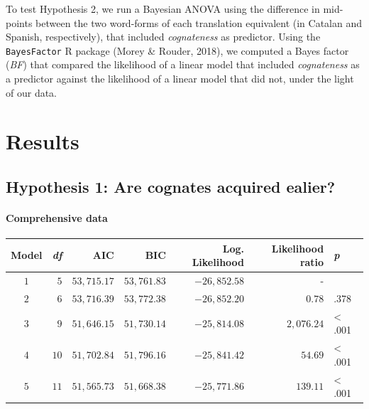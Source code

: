 \documentclass[
  english,
  man,man,floatsintext]{apa6}
\let\oldparagraph\paragraph
\renewcommand{\paragraph}[1]{\oldparagraph{#1}\mbox{}}
\begin{document}
To test Hypothesis 2, we run a Bayesian ANOVA using the difference in mid-points between the two word-forms of each translation equivalent (in Catalan and Spanish, respectively), that included \emph{cognateness} as predictor. Using the \texttt{BayesFactor} R package (Morey \& Rouder, 2018), we computed a Bayes factor (\emph{BF}) that compared the likelihood of a linear model that included \emph{cognateness} as a predictor against the likelihood of a linear model that did not, under the light of our data.

\hypertarget{results}{%
\section{Results}\label{results}}

\hypertarget{hypothesis-1-are-cognates-acquired-ealier}{%
\subsection{Hypothesis 1: Are cognates acquired ealier?}\label{hypothesis-1-are-cognates-acquired-ealier}}

\hypertarget{comprehensive-data}{%
\paragraph{Comprehensive data}\label{comprehensive-data}}

\captionsetup[table]{labelformat=empty,skip=1pt}
\begin{longtable}{crrrrrl}
\toprule
Model & \emph{df} & AIC & BIC & Log. Likelihood & Likelihood ratio & \emph{p} \\ 
\midrule
$1$ & $5$ & $53,715.17$ & $53,761.83$ & $-26,852.58$ & - &  \\ 
$2$ & $6$ & $53,716.39$ & $53,772.38$ & $-26,852.20$ & $0.78$ & .378 \\ 
$3$ & $9$ & $51,646.15$ & $51,730.14$ & $-25,814.08$ & $2,076.24$ & < .001 \\ 
$4$ & $10$ & $51,702.84$ & $51,796.16$ & $-25,841.42$ & $54.69$ & < .001 \\ 
$5$ & $11$ & $51,565.73$ & $51,668.38$ & $-25,771.86$ & $139.11$ & < .001 \\ 
\bottomrule
\end{longtable}
\end{document}
